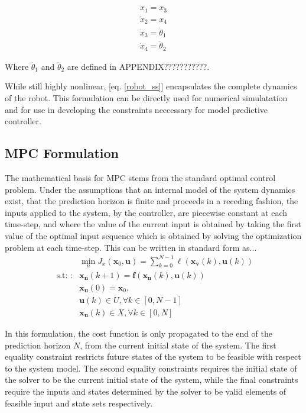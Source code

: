 \documentclass[journal]{IEEEtran}
\begin{document}
\begin{equation}\label{robot_ss}
\begin{array}{l}
\dot{x}_{1}=x_{3} \\
\dot{x}_{2}=x_{4} \\
\dot{x}_{3}=\ddot{\theta}_{1} \\
\dot{x}_{4}=\ddot{\theta}_{2}
\end{array}
\end{equation}

Where $ \ddot{\theta}_{1}$ and $\ddot{\theta}_{2}$ are defined in APPENDIX???????????.

While still highly nonlinear, [eq. \ref{robot_ss}] encapsulates the complete dynamics of the robot. This formulation can be directly used for numerical simulatation and for use in developing the constraints neccessary for model predictive controller.


\subsection{MPC Formulation}
The mathematical basis for MPC stems from the standard optimal control problem. Under the assumptions that an internal model of the system dynamics exist, that the prediction horizon is finite and proceeds in a receding fashion, the inputs applied to the system, by the controller, are piecewise constant at each time-step, and where the value of the current input is obtained by taking the first value of the optimal input sequence which is obtained by solving the optimization problem at each time-step. This can be written in standard form as...
\begin{equation}
\begin{aligned}
& \min _{n} J_{x}\left(\mathbf{x}_{0}, \mathbf{u}\right)=\sum_{k=0}^{N-1} \ell\left(\mathbf{x}_{\mathbf{v}}(k), \mathbf{u}(k)\right) \\
\text { s.t: }: & \mathbf{x}_{\mathbf{n}}(k+1)=\mathbf{f}\left(\mathbf{x}_{\mathbf{n}}(k), \mathbf{u}(k)\right) \\
& \mathbf{x}_{\mathbf{u}}(0)=\mathbf{x}_{0}, \\
& \mathbf{u}(k) \in U, \forall k \in[0, N-1] \\
& \mathbf{x}_{\mathbf{u}}(k) \in X, \forall k \in[0, N]
\end{aligned}
\end{equation}

In this formulation, the cost function is only propagated to the end of the prediction horizon $N$, from the current initial state of the system. The first equality constraint restricts future states of the system to be feasible with respect to the system model. The second equality constraints requires the initial state of the solver to be the current initial state of the system, while the final constraints require the inputs and states determined by the solver to be valid elements of feasible input and state sets respectively. \\
\end{document}
